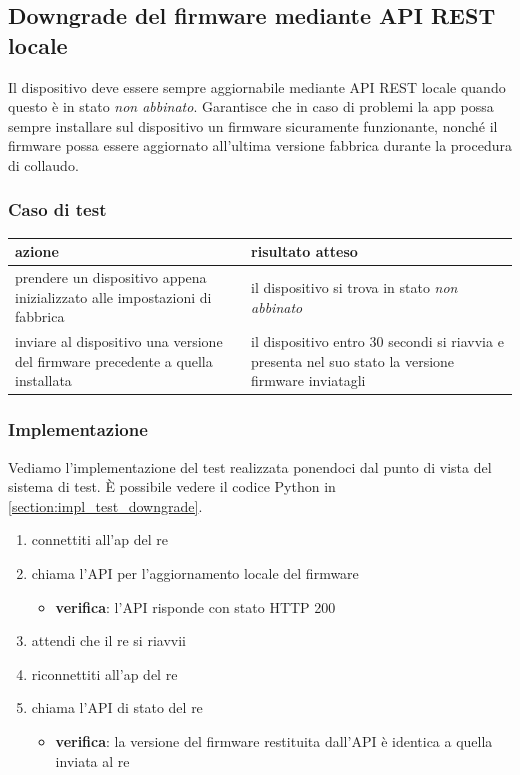 \documentclass[12pt,a4paper,twoside,titlepage]{book}
\begin{document}
\subsection{Downgrade del firmware mediante API REST locale}
\label{section:test_downgrade}

Il dispositivo deve essere sempre aggiornabile mediante API REST locale quando questo
è in stato \textit{non abbinato}. Garantisce che in caso di problemi la app possa sempre
installare sul dispositivo un \gls{firmware} sicuramente funzionante, nonché il \gls{firmware}
possa essere aggiornato all’ultima versione fabbrica durante la procedura di collaudo.

\subsubsection{Caso di test}
\begin{center}
\begin{tabular}{| p{} | p{} |}
    \hline
    \textbf{azione} & \textbf{risultato atteso} \\ \hline
    prendere un dispositivo appena inizializzato alle impostazioni di fabbrica & il dispositivo si trova in stato \textit{non abbinato} \\ \hline
    inviare al dispositivo una versione del \gls{firmware} precedente a quella installata & il dispositivo entro 30 secondi si riavvia e presenta nel suo stato la versione \gls{firmware} inviatagli \\ \hline
\end{tabular}
\end{center}

\subsubsection{Implementazione}
Vediamo l'implementazione del test realizzata ponendoci dal punto di vista del sistema di test. 
È possibile vedere il codice Python in \autoref{section:impl_test_downgrade}.

\begin{enumerate}
    \item connettiti all'\acrshort{ap} del \acrshort{re}
    \item chiama l'API per l'aggiornamento locale del \gls{firmware}
    \begin{itemize}
        \item \textbf{verifica}: l'API risponde con stato HTTP 200 
    \end{itemize}
    \item attendi che il \acrshort{re} si riavvii
    \item riconnettiti all'\acrshort{ap} del \acrshort{re}
    \item chiama l'API di stato del \acrshort{re}
    \begin{itemize}
        \item \textbf{verifica}: la versione del \gls{firmware} restituita dall'API è identica 
            a quella inviata al \acrshort{re}
    \end{itemize}
\end{enumerate}
\end{document}
